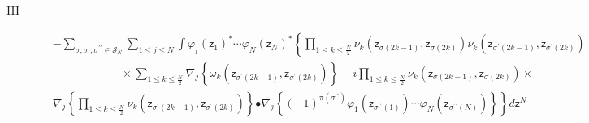 \documentclass[aps,preprint]{revtex4}%
\begin{document}
\begin{description}
\item[III]
\begin{align}
&  -%
{\displaystyle\sum\limits_{\sigma,\sigma^{\prime},\sigma^{\prime\prime}%
\in\mathcal{S}_{N}}}
{\displaystyle\sum\limits_{1\leq j\leq N}}
\int\varphi_{_{1}}\left(  \mathsf{z}_{1}\right)  ^{\ast}\cdots\varphi
_{N}\left(  \mathsf{z}_{N}\right)  ^{\ast}\left\{
{\displaystyle\prod\limits_{1\leq k\leq\frac{N}{2}}}
\nu_{k}\left(  \mathsf{z}_{\sigma\left(  2k-1\right)  },\mathsf{z}%
_{\sigma\left(  2k\right)  }\right)  \nu_{k}\left(  \mathsf{z}_{\sigma
^{\prime}\left(  2k-1\right)  },\mathsf{z}_{\sigma^{\prime}\left(  2k\right)
}\right)  \right. \nonumber\\
&  \qquad\qquad\qquad\times%
{\displaystyle\sum\limits_{1\leq k\leq\frac{N}{2}}}
\nabla_{j}\left\{  \omega_{k}\left(  \mathsf{z}_{\sigma^{\prime}\left(
2k-1\right)  },\mathsf{z}_{\sigma^{\prime}\left(  2k\right)  }\right)
\right\}  -i%
{\displaystyle\prod\limits_{1\leq k\leq\frac{N}{2}}}
\nu_{k}\left(  \mathsf{z}_{\sigma\left(  2k-1\right)  },\mathsf{z}%
_{\sigma\left(  2k\right)  }\right)  \times\nonumber\\
&  \nabla_{j}\left\{
{\displaystyle\prod\limits_{1\leq k\leq\frac{N}{2}}}
\nu_{k}\left(  \mathsf{z}_{\sigma^{\prime}\left(  2k-1\right)  }%
,\mathsf{z}_{\sigma^{\prime}\left(  2k\right)  }\right)  \right\}  \left.
\bullet\nabla_{j}\left\{  \left(  -1\right)  ^{\pi\left(  \sigma^{\prime
\prime}\right)  }\varphi_{1}\left(  \mathsf{z}_{\sigma^{\prime\prime}\left(
1\right)  }\right)  \cdots\varphi_{N}\left(  \mathsf{z}_{\sigma^{\prime\prime
}\left(  N\right)  }\right)  \right\}  \right\}  d\mathsf{z}^{N}%
\end{align}



\end{description}
\end{document}
